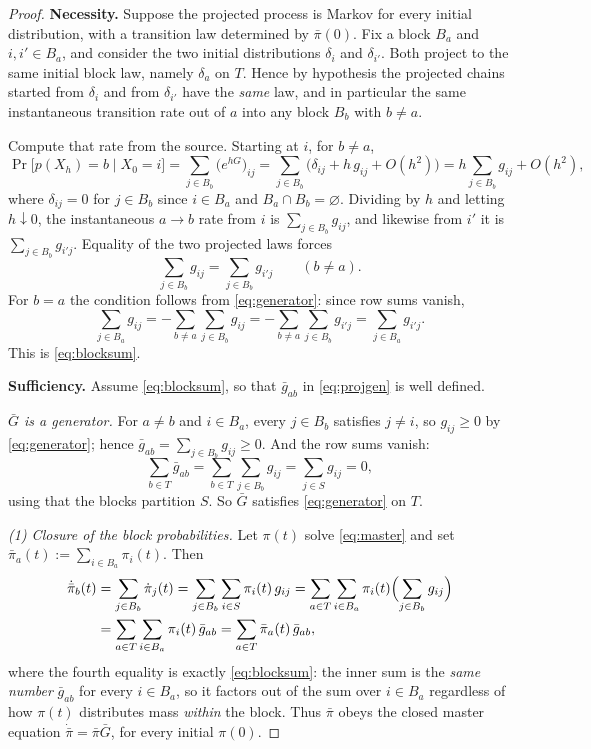 \documentclass[11pt,reqno]{amsart}
\theoremstyle{plain}
\theoremstyle{definition}
\theoremstyle{remark}
\begin{document}
\begin{proof}
\textbf{Necessity.} Suppose the projected process is Markov for every initial distribution, with a transition law determined by $\bar\pi(0)$. Fix a block $B_a$ and $i,i'\in B_a$, and consider the two initial distributions $\delta_i$ and $\delta_{i'}$. Both project to the same initial block law, namely $\delta_a$ on $T$. Hence by hypothesis the projected chains started from $\delta_i$ and from $\delta_{i'}$ have the \emph{same} law, and in particular the same instantaneous transition rate out of $a$ into any block $B_b$ with $b\neq a$.

Compute that rate from the source. Starting at $i$, for $b\neq a$,
\[
\Pr\bigl[p(X_h)=b \mid X_0=i\bigr]=\sum_{j\in B_b}\bigl(e^{hG}\bigr)_{ij}
=\sum_{j\in B_b}\bigl(\delta_{ij}+h\,g_{ij}+O(h^2)\bigr)
=h\sum_{j\in B_b}g_{ij}+O(h^2),
\]
where $\delta_{ij}=0$ for $j\in B_b$ since $i\in B_a$ and $B_a\cap B_b=\varnothing$. Dividing by $h$ and letting $h\downarrow0$, the instantaneous $a\to b$ rate from $i$ is $\sum_{j\in B_b}g_{ij}$, and likewise from $i'$ it is $\sum_{j\in B_b}g_{i'j}$. Equality of the two projected laws forces
\[
\sum_{j\in B_b}g_{ij}=\sum_{j\in B_b}g_{i'j}\qquad(b\neq a).
\]
For $b=a$ the condition follows from \eqref{eq:generator}: since row sums vanish,
\[
\sum_{j\in B_a}g_{ij}=-\sum_{b\neq a}\sum_{j\in B_b}g_{ij}=-\sum_{b\neq a}\sum_{j\in B_b}g_{i'j}=\sum_{j\in B_a}g_{i'j}.
\]
This is \eqref{eq:blocksum}.

\textbf{Sufficiency.} Assume \eqref{eq:blocksum}, so that $\bar g_{ab}$ in \eqref{eq:projgen} is well defined.

\emph{$\bar G$ is a generator.} For $a\neq b$ and $i\in B_a$, every $j\in B_b$ satisfies $j\neq i$, so $g_{ij}\ge0$ by \eqref{eq:generator}; hence $\bar g_{ab}=\sum_{j\in B_b}g_{ij}\ge0$. And the row sums vanish:
\[
\sum_{b\in T}\bar g_{ab}=\sum_{b\in T}\sum_{j\in B_b}g_{ij}=\sum_{j\in S}g_{ij}=0 ,
\]
using that the blocks partition $S$. So $\bar G$ satisfies \eqref{eq:generator} on $T$.

\emph{(1) Closure of the block probabilities.} Let $\pi(t)$ solve \eqref{eq:master} and set $\bar\pi_a(t):=\sum_{i\in B_a}\pi_i(t)$. Then
\[
\begin{aligned}
\dot{\bar\pi}_b(t)
&=\sum_{j\in B_b}\dot\pi_j(t)
=\sum_{j\in B_b}\sum_{i\in S}\pi_i(t)\,g_{ij}
=\sum_{a\in T}\sum_{i\in B_a}\pi_i(t)\Bigl(\sum_{j\in B_b}g_{ij}\Bigr)\\
&=\sum_{a\in T}\sum_{i\in B_a}\pi_i(t)\,\bar g_{ab}
=\sum_{a\in T}\bar\pi_a(t)\,\bar g_{ab},
\end{aligned}
\]
where the fourth equality is exactly \eqref{eq:blocksum}: the inner sum is the \emph{same number} $\bar g_{ab}$ for every $i\in B_a$, so it factors out of the sum over $i\in B_a$ regardless of how $\pi(t)$ distributes mass \emph{within} the block. Thus $\bar\pi$ obeys the closed master equation $\dot{\bar\pi}=\bar\pi\bar G$, for every initial $\pi(0)$.


\end{proof}
\end{document}
